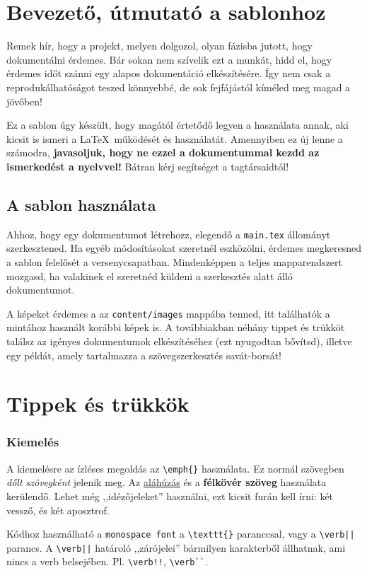 	\section{Bevezető, útmutató a sablonhoz}
Remek hír, hogy a projekt, melyen dolgozol, olyan fázisba jutott, hogy dokumentálni érdemes. Bár sokan nem szívelik ezt a munkát, hidd el, hogy érdemes időt szánni egy alapos dokumentáció elkészítésére. Így nem csak a reprodukálhatóságot teszed könnyebbé, de sok fejfájástól kíméled meg magad a jövőben!

Ez a sablon úgy készült, hogy magától értetődő legyen a használata annak, aki kicsit is ismeri a \LaTeX\ működését és használatát. Amennyiben ez új lenne a számodra, \textbf{javasoljuk, hogy ne ezzel a dokumentummal kezdd az ismerkedést a nyelvvel!} Bátran kérj segítséget a tagtársaidtól!

\subsection{A sablon használata}
Ahhoz, hogy egy dokumentumot létrehozz, elegendő a \verb|main.tex| állományt szerkesztened. Ha egyéb módosításokat szeretnél eszközölni, érdemes megkeresned a sablon felelősét a versenycsapatban. Mindenképpen a teljes mapparendszert mozgasd, ha valakinek el szeretnéd küldeni a szerkesztés alatt álló dokumentumot.

A képeket érdemes a az \verb|content/images| mappába tenned, itt találhatók a mintához használt korábbi képek is. A továbbiakban néhány tippet és trükköt találsz az igényes dokumentumok elkészítéséhez (ezt nyugodtan bővítsd), illetve egy példát, amely tartalmazza a szövegszerkesztés savát-borsát!

\section{Tippek és trükkök}

\subsubsection*{Kiemelés}
A kiemelésre az ízléses megoldás az \verb|\emph{}| használata. Ez normál szövegben \emph{dőlt szövegként} jelenik meg. Az \underline{aláhúzás} és a \textbf{félkövér szöveg} használata kerülendő. Lehet még ,,idézőjeleket'' használni, ezt kicsit furán kell írni: két vessző, és két aposztrof.

Kódhoz használható a \texttt{monospace font} a \verb|\texttt{}| paranccsal, vagy a \verb!\verb||! parancs. A \verb!\verb||! határoló ,,zárójelei'' bármilyen karakterből állhatnak, ami nincs a verb belsejében. Pl. \verb|\verb!!|, \verb|\verb``|.

